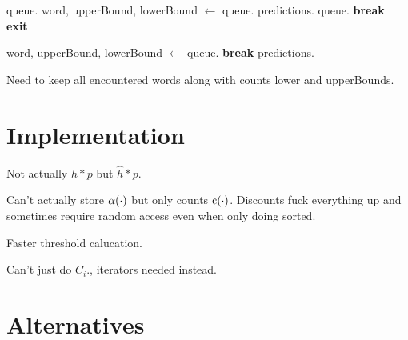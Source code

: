 \begin{algorithm}
\begin{algorithmic}[1]
      \vspace{0.7em}
      \State queue.
        \State word, upperBound, lowerBound $\gets$ queue.
          \State predictions.
        \Else
          \State queue.
          \State \textbf{break}
        \EndIf
          \State \textbf{exit}
        \EndIf
      \EndWhile
    \EndWhile

    \vspace{0.7em}
      \State word, upperBound, lowerBound $\gets$ queue.
        \State \textbf{break}
      \EndIf
      \State predictions.
    \EndFor
  \end{algorithmic}
\end{algorithm}


\begin{draft}
Need to keep all encountered words along with counts lower and upperBounds.
\end{draft}

\section{Implementation}

\begin{draft}
Not actually $h * p$ but $\hat{h} * p$.

Can't actually store $\alpha(\cdot)$ but only counts $\operatorname{c}(\cdot)$.
Discounts fuck everything up and sometimes require random access even when only
doing sorted.

Faster threshold calucation.

Can't just do $C_i$., iterators needed instead.
\end{draft}

\section{Alternatives}

